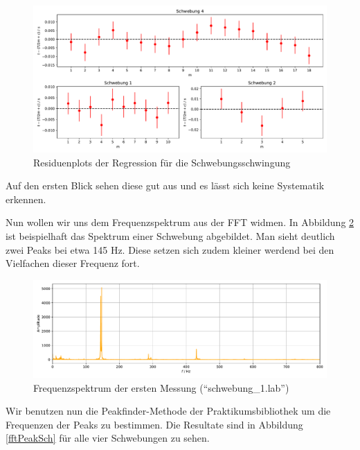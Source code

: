 \begin{figure}[H]
	\centering
	\includegraphics[width=\linewidth]{plots/residuenSch.pdf}
	\caption{Residuenplots der Regression für die Schwebungsschwingung}
	\label{residuenSch}
\end{figure}

Auf den ersten Blick sehen diese gut aus und es lässt sich keine Systematik erkennen.


Nun wollen wir uns dem Frequenzspektrum aus der FFT widmen. In Abbildung \ref{freqSpecSch} ist beispielhaft das Spektrum einer Schwebung abgebildet. Man sieht deutlich zwei Peaks bei etwa 145 Hz. Diese setzen sich zudem kleiner werdend bei den Vielfachen dieser Frequenz fort.
\begin{figure}[H]
	\centering
	\includegraphics[width=\linewidth]{plots/schwebungsspektrum.pdf}
	\caption{Frequenzspektrum der ersten Messung (\mbox{``schwebung\_1.lab''})}
	\label{freqSpecSch}
\end{figure}

Wir benutzen nun die Peakfinder-Methode der Praktikumsbibliothek um die Frequenzen der Peaks zu bestimmen. Die Resultate sind in Abbildung \ref{fftPeakSch} für alle vier Schwebungen zu sehen.

